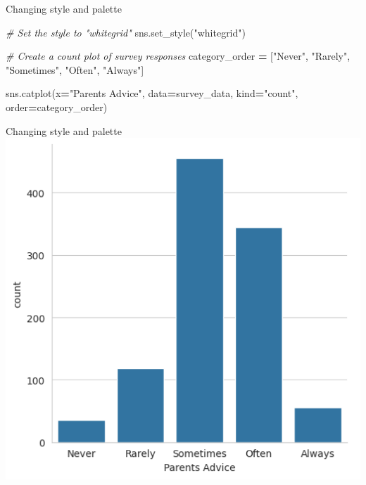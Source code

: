 \documentclass[
  ignorenonframetext,
]{beamer}
\newenvironment{Shaded}{\begin{snugshade}}{\end{snugshade}}
\newcommand{\CommentTok}[1]{\textcolor[rgb]{0.56,0.35,0.01}{\textit{#1}}}
\newcommand{\NormalTok}[1]{#1}
\newcommand{\OperatorTok}[1]{\textcolor[rgb]{0.81,0.36,0.00}{\textbf{#1}}}
\newcommand{\StringTok}[1]{\textcolor[rgb]{0.31,0.60,0.02}{#1}}
\begin{document}
\begin{frame}[fragile]{Changing style and palette}
\label{changing-style-and-palette-4}

\begin{Shaded}
\begin{Highlighting}[]
\CommentTok{\# Set the style to "whitegrid"}
\NormalTok{sns.set\_style(}\StringTok{"whitegrid"}\NormalTok{)}

\CommentTok{\# Create a count plot of survey responses}
\NormalTok{category\_order }\OperatorTok{=}\NormalTok{ [}\StringTok{"Never"}\NormalTok{, }\StringTok{"Rarely"}\NormalTok{, }\StringTok{"Sometimes"}\NormalTok{, }
                  \StringTok{"Often"}\NormalTok{, }\StringTok{"Always"}\NormalTok{]}

\NormalTok{sns.catplot(x}\OperatorTok{=}\StringTok{"Parents Advice"}\NormalTok{, }
\NormalTok{            data}\OperatorTok{=}\NormalTok{survey\_data, }
\NormalTok{            kind}\OperatorTok{=}\StringTok{"count"}\NormalTok{, }
\NormalTok{            order}\OperatorTok{=}\NormalTok{category\_order)}
\end{Highlighting}
\end{Shaded}
\end{frame}

\begin{frame}{Changing style and palette}
\label{changing-style-and-palette-5}
\includegraphics{../images/im296.png}
\end{frame}
\end{document}
